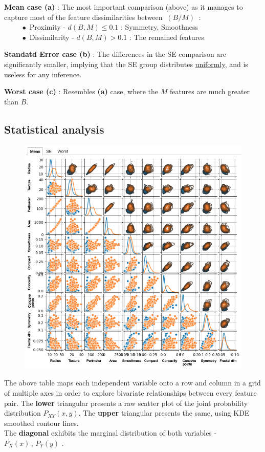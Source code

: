 \documentclass[12pt]{article}
\numberwithin{equation}{section}
\begin{document}
\begin{flushleft}
\textbf{Mean case (a)} : The most important comparison (above) as it manages to capture most of the feature dissimilarities between $\ (B/M) \ $ : \\[0.1cm]
$\hspace{1cm} \bullet$ Proximity - \hspace{3.3mm} $d(B,M) \leq 0.1$ : Symmetry, Smoothness \\[0.1cm]

$\hspace{1cm} \bullet$ Dissimilarity - $d(B,M) > 0.1$ : The remained features 

\textbf{Standatd Error case (b)} : The differences in the SE comparison are significantly smaller, implying that the SE group distributes \underline{uniformly}, and is useless for any inference.

\textbf{Worst case (c)} : Resembles \textbf{(a)} case, where the $M$ features are much greater than $B$.


\subsection{Statistical analysis}
 
\begin{figure}[H] 
\centering
\includegraphics[width=0.773\linewidth, center]{Statistics.png}
\end{figure}

The above table maps each independent variable onto a row and column in a grid of multiple axes in order to explore bivariate relationships between every feature pair. The \textbf{lower} triangular presents a raw scatter plot of the joint probability distribution $P_{XY}(x, y)$. The \textbf{upper} triangular presents the same, using KDE smoothed contour lines. \\ The \textbf{diagonal} exhibits the marginal distribution of both variables - $P_{X}(x) \, , \, P_{Y}(y)$ .


\end{flushleft}
\end{document}
